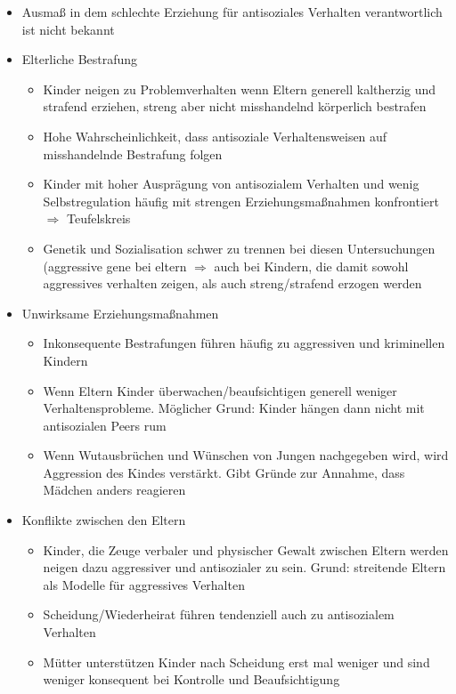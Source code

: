 \begin{itemize}
	\item
		Ausmaß in dem schlechte Erziehung für antisoziales Verhalten verantwortlich ist nicht bekannt
	\item
		Elterliche Bestrafung
		\begin{itemize}
			\item
				Kinder neigen zu Problemverhalten wenn Eltern generell kaltherzig und strafend erziehen, streng aber nicht misshandelnd körperlich bestrafen
			\item
				Hohe Wahrscheinlichkeit, dass antisoziale Verhaltensweisen auf misshandelnde Bestrafung folgen
			\item
				Kinder mit hoher Ausprägung von antisozialem Verhalten und wenig Selbstregulation häufig mit strengen Erziehungsmaßnahmen konfrontiert $\Rightarrow$ Teufelskreis
			\item
				Genetik und Sozialisation schwer zu trennen bei diesen Untersuchungen (aggressive gene bei eltern $\Rightarrow$ auch bei Kindern, die damit sowohl aggressives verhalten zeigen, als auch streng/strafend erzogen werden
		\end{itemize}
	\item
		Unwirksame Erziehungsmaßnahmen
		\begin{itemize}
			\item
				Inkonsequente Bestrafungen führen häufig zu aggressiven und kriminellen Kindern
			\item
				Wenn Eltern Kinder überwachen/beaufsichtigen generell weniger Verhaltensprobleme. Möglicher Grund: Kinder hängen dann nicht mit antisozialen Peers rum
			\item
				Wenn Wutausbrüchen und Wünschen von Jungen nachgegeben wird, wird Aggression des Kindes verstärkt. Gibt Gründe zur Annahme, dass Mädchen anders reagieren
		\end{itemize}
	\item
		Konflikte zwischen den Eltern
		\begin{itemize}
			\item
				Kinder, die Zeuge verbaler und physischer Gewalt zwischen Eltern werden neigen dazu aggressiver und antisozialer zu sein. Grund: streitende Eltern als Modelle für aggressives Verhalten
			\item
				Scheidung/Wiederheirat führen tendenziell auch zu antisozialem Verhalten
			\item
				Mütter unterstützen Kinder nach Scheidung erst mal weniger und sind weniger konsequent bei Kontrolle und Beaufsichtigung

\end{itemize}
\end{itemize}
